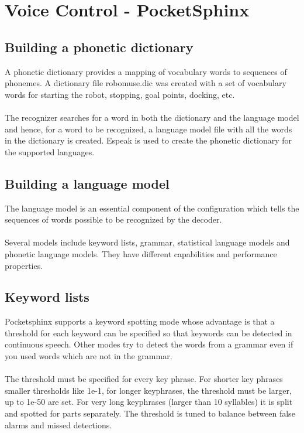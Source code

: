 \documentclass[12pt]{article}
\begin{document}
\newpage

\section{Voice Control - PocketSphinx}

\subsection{Building a phonetic dictionary}
A phonetic dictionary provides a mapping of vocabulary words to sequences of phonemes. A dictionary file robomuse.dic was created with a set of vocabulary words for starting the robot, stopping, goal points, docking, etc.\\ \\
The recognizer searches for a word in both the dictionary and the language model and hence, for a word to be recognized, a language model file with all the words in the dictionary is created. Espeak is used to create the phonetic dictionary for the supported languages.

\subsection{Building a language model}
The language model is an essential component of the configuration which tells the sequences of words possible to be recognized by the decoder.\\ \\
Several models include keyword lists, grammar, statistical language models and phonetic language models. They have different capabilities and performance properties. 

\subsection{Keyword lists}
Pocketsphinx supports a keyword spotting mode whose advantage is that a threshold for each keyword can be specified so that keywords can be detected in continuous speech. Other modes try to detect the words from a grammar even if you used words which are not in the grammar.\\ \\
The threshold must be specified for every key phrase. For shorter key phrases smaller thresholds like 1e-1, for longer keyphrases, the threshold must be larger, up to 1e-50 are set. For very long keyphrases (larger than 10 syllables) it is split and spotted for parts separately. The threshold is tuned to balance between false alarms and missed detections.
\end{document}
